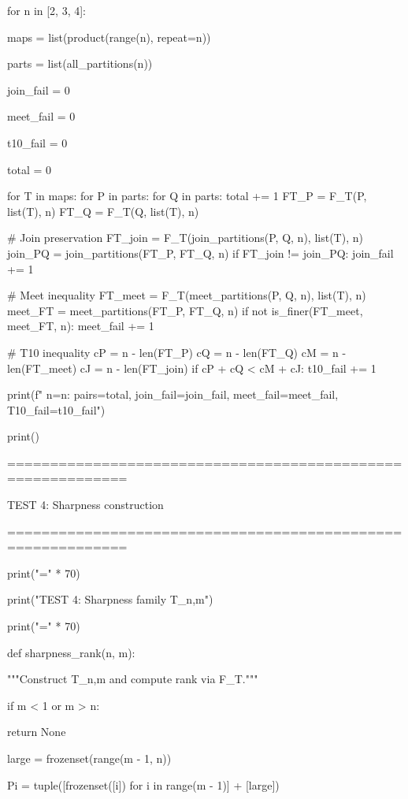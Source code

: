 for n in [2, 3, 4]:

maps = list(product(range(n), repeat=n))

parts = list(all_partitions(n))

join_fail = 0

meet_fail = 0

t10_fail = 0

total = 0


for T in maps:  
    for P in parts:  
        for Q in parts:  
            total += 1  
            FT_P = F_T(P, list(T), n)  
            FT_Q = F_T(Q, list(T), n)  
              
            # Join preservation  
            FT_join = F_T(join_partitions(P, Q, n), list(T), n)  
            join_PQ = join_partitions(FT_P, FT_Q, n)  
            if FT_join != join_PQ:  
                join_fail += 1  
              
            # Meet inequality  
            FT_meet = F_T(meet_partitions(P, Q, n), list(T), n)  
            meet_FT = meet_partitions(FT_P, FT_Q, n)  
            if not is_finer(FT_meet, meet_FT, n):  
                meet_fail += 1  
              
            # T10 inequality  
            cP = n - len(FT_P)  
            cQ = n - len(FT_Q)  
            cM = n - len(FT_meet)  
            cJ = n - len(FT_join)  
            if cP + cQ < cM + cJ:  
                t10_fail += 1  
  
print(f"  n={n}: pairs={total}, join_fail={join_fail}, meet_fail={meet_fail}, T10_fail={t10_fail}")  



print()


============================================================


TEST 4: Sharpness construction


============================================================


print("=" * 70)

print("TEST 4: Sharpness family T_{n,m}")

print("=" * 70)


def sharpness_rank(n, m):

"""Construct T_{n,m} and compute rank via F_T."""

if m < 1 or m > n:

return None

large = frozenset(range(m - 1, n))

Pi = tuple([frozenset([i]) for i in range(m - 1)] + [large])

